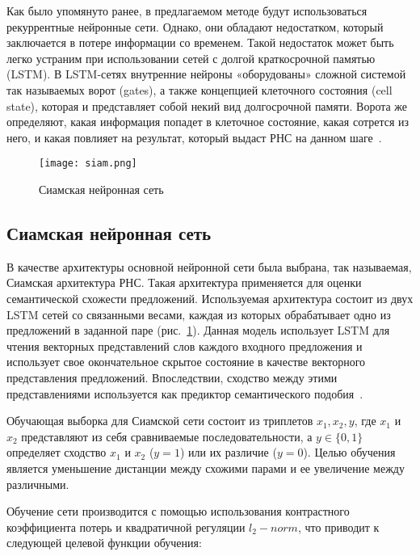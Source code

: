 Как было упомянуто ранее, в предлагаемом методе будут использоваться рекуррентные нейронные сети. Однако, они обладают недостатком, который заключается в потере информации со временем. Такой недостаток может быть легко устраним при использовании сетей с долгой краткосрочной памятью (LSTM). В LSTM-сетях внутренние нейроны «оборудованы» сложной системой так называемых ворот (gates), а также концепцией клеточного состояния (cell state), которая и представляет собой некий вид долгосрочной памяти. Ворота же определяют, какая информация попадет в клеточное состояние, какая сотрется из него, и какая повлияет на результат, который выдаст РНС на данном шаге~\cite{siam}.


\begin{figure}[htbp]
\centering
\texttt{[image: siam.png]}
\caption{Сиамская нейронная сеть}
\label{fig:siam_mod}
\end{figure}

\subsection{Сиамская нейронная сеть}

В качестве архитектуры основной нейронной сети была выбрана, так называемая, Сиамская архитектура РНС. Такая архитектура применяется для оценки семантической схожести предложений. Используемая архитектура состоит из двух LSTM сетей со связанными весами, каждая из которых обрабатывает одно из предложений в заданной паре (рис.~\ref{fig:siam_mod}). Данная модель использует LSTM для чтения векторных представлений слов каждого входного предложения и использует свое окончательное скрытое состояние в качестве векторного представления предложений. Впоследствии, сходство между этими представлениями используется как предиктор семантического подобия~\cite{siam}.

Обучающая выборка для Сиамской сети состоит из триплетов \(x_1, x_2, y\), где \(x_1\) и \(x_2\) представляют из себя сравниваемые последовательности, а \(y \in \{0,1\}\) определяет сходство \(x_1\) и \(x_2\) (\(y = 1\)) или их различие (\(y = 0\)). Целью обучения является уменьшение дистанции между схожими парами и ее увеличение между различными.

Обучение сети производится с помощью использования контрастного коэффициента потерь и квадратичной регуляции \(l_2-norm\), что приводит к следующей целевой функции обучения:

